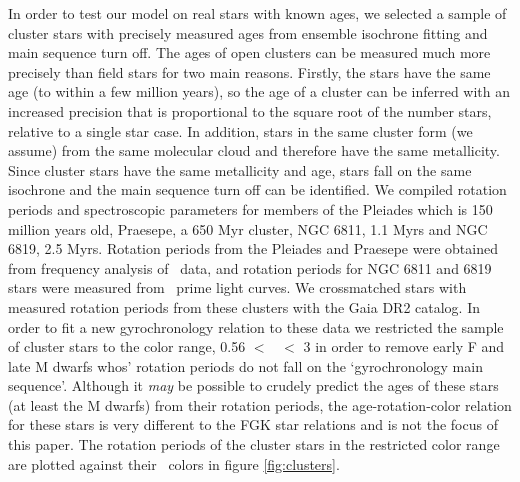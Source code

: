 In order to test our model on real stars with known ages, we selected a sample
of cluster stars with precisely measured ages from ensemble isochrone fitting
and main sequence turn off.
The ages of open clusters can be measured much more precisely than field
stars for two main reasons.
Firstly, the stars have the same age (to within a few million years), so the
age of a cluster can be inferred with an increased precision that is
proportional to the square root of the number stars, relative to a single star
case.
In addition, stars in the same cluster form (we assume) from the same
molecular cloud and therefore have the same metallicity.
Since cluster stars have the same metallicity and age, stars fall on the same
isochrone and the main sequence turn
off can be identified.
We compiled rotation periods and spectroscopic parameters for members of
the Pleiades which is 150 million years old, Praesepe, a 650 Myr cluster,
NGC 6811, 1.1 Myrs and NGC 6819, 2.5 Myrs.
Rotation periods from the Pleiades \citep{rebull2016} and Praesepe
\citep{douglas2016} were obtained from frequency analysis of \ktwo\ data, and
rotation periods for NGC 6811 \citep{meibom2013} and 6819 \citep{meibom2015}
stars were measured from \kepler\ prime light curves.
We crossmatched stars with measured rotation periods from these clusters with
the Gaia DR2 catalog.
In order to fit a new gyrochronology relation to these data we restricted the
sample of cluster stars to the color range, 0.56 $<$ \gcolor\ $<$ 3 in order
to remove early F and late M dwarfs whos' rotation periods do not fall on the
`gyrochronology main sequence'.
Although it {\it may} be possible to crudely predict the ages of these stars
(at least the M dwarfs) from their rotation periods, the age-rotation-color
relation for these stars is very different to the FGK star relations and is
not the focus of this paper.
The rotation periods of the cluster stars in the restricted color range are
plotted against their \Gaia\ colors in figure \ref{fig:clusters}.



